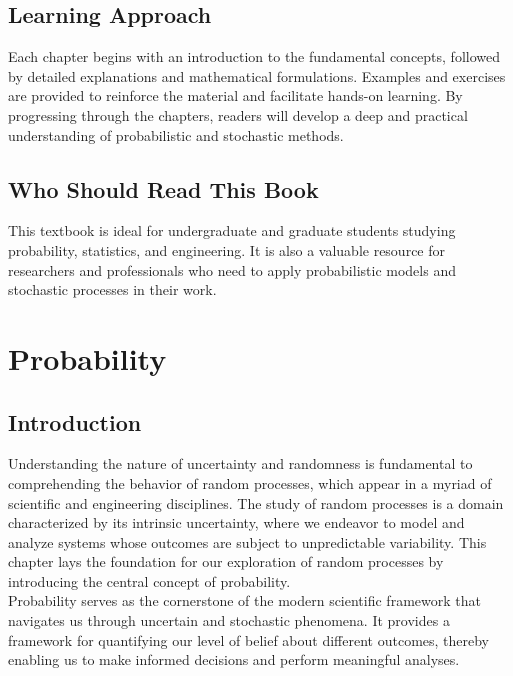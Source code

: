 \documentclass[12pt]{book}
\theoremstyle{definition}
\begin{document}
\section*{Learning Approach}

Each chapter begins with an introduction to the fundamental concepts, followed by detailed explanations and mathematical formulations. Examples and exercises are provided to reinforce the material and facilitate hands-on learning. By progressing through the chapters, readers will develop a deep and practical understanding of probabilistic and stochastic methods.

\section*{Who Should Read This Book}

This textbook is ideal for undergraduate and graduate students studying probability, statistics, and engineering. It is also a valuable resource for researchers and professionals who need to apply probabilistic models and stochastic processes in their work.



\chapter{Probability}

\section{Introduction}

Understanding the nature of uncertainty and randomness is fundamental to comprehending the behavior of random processes, which appear in a myriad of scientific and engineering disciplines. The study of random processes is a domain characterized by its intrinsic uncertainty, where we endeavor to model and analyze systems whose outcomes are subject to unpredictable variability. This chapter lays the foundation for our exploration of random processes by introducing the central concept of probability.\\

Probability serves as the cornerstone of the modern scientific framework that navigates us through uncertain and stochastic phenomena. It provides a framework for quantifying our level of belief about different outcomes, thereby enabling us to make informed decisions and perform meaningful analyses. \\
\end{document}
